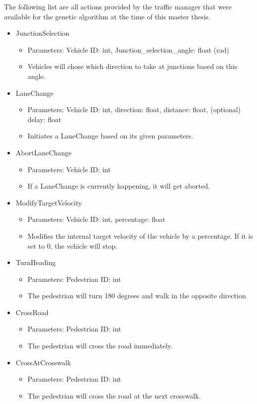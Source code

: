 The following list are all actions provided by the traffic manager that were available for the genetic algorithm at the time of this master thesis.
\begin{itemize}
	\item JunctionSelection
	\begin{itemize}
		\item Parameters: Vehicle ID: int, Junction\_selection\_angle: float (rad)
		\item Vehicles will chose which direction to take at junctions based on this angle.
	\end{itemize}
	\item LaneChange
	\begin{itemize}
		\item Parameters: Vehicle ID: int, direction: float, distance: float, (optional) delay: float
		\item Initiates a LaneChange based on its given parameters.
	\end{itemize}
	\item AbortLaneChange
	\begin{itemize}
		\item Parameters: Vehicle ID: int
		\item If a LaneChange is currently happening, it will get aborted.
	\end{itemize}
	\item ModifyTargetVelocity
	\begin{itemize}
		\item Parameters: Vehicle ID: int, percentage: float
		\item Modifies the internal target velocity of the vehicle by a percentage. If it is set to 0, the vehicle will stop.
	\end{itemize}
	\item TurnHeading
	\begin{itemize}
		\item Parameters: Pedestrian ID: int
		\item The pedestrian will turn 180 degrees and walk in the opposite direction
	\end{itemize}
	\item CrossRoad
	\begin{itemize}
		\item Parameters: Pedestrian ID: int
		\item The pedestrian will cross the road immediately.
	\end{itemize}
	\item CrossAtCrosswalk
	\begin{itemize}
		\item Parameters: Pedestrian ID: int
		\item The pedestrian will cross the road at the next crosswalk.
	\end{itemize}
\end{itemize}

